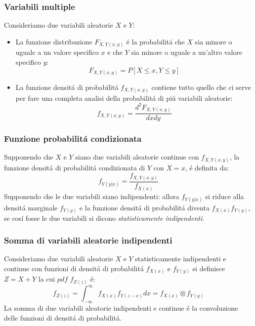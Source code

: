         \subsubsection{Variabili multiple}
            Consideriamo due variabili aleatorie $X$ e $Y$:
            \begin{itemize}
                \item {
                    La funzione distribuzione $F_{X,Y (x,y)}$ é la probabilitá che $X$ sia minore o uguale a un valore specifico $x$ e che $Y$
                    sia minore o uguale a un'altro valore specifico $y$:
                    \[
                        F_{X,Y (x,y)} = P[X\leq x,Y\leq y]    
                    \]
                }
                \item {
                    La funzione densitá di probabilitá $f_{X,Y (x,y)}$ contiene tutto quello che ci serve per fare una completa analisi della probabilitá
                    di piú variabili aleatorie:
                    \[
                        f_{X,Y (x,y)} = \frac{d^2 F_{X,Y (x,y)}}{dxdy}     
                    \]

                }
            \end{itemize}
        \subsubsection{Funzione probabilitá condizionata}
            Supponendo che $X$ e $Y$ siano due variabili aleatorie continue con $f_{X,Y (x,y)}$, la funzione densitá di probabilitá condizionata di $Y$ con $X=x$,
            é definita da:
            \[
                f_{Y (y|x)} = \frac{f_{X,Y (x,y)}}{f_{X(x)}}     
            \]
            Supponendo che le due variabili siano indipendenti: allora $f_{Y (y|x)}$ si riduce alla densitá marginale $f_{Y (y)}$ e la funzione densitá di
            probabilitá diventa $f_{X (x)}f_{Y (y)}$, se cosí fosse le due variabili si dicono \emph{statisticamente indipendenti}.
        \subsubsection{Somma di variabili aleatorie indipendenti}
            Consideriamo due variabili aleatorie $X$ e $Y$ statisticamente indipendenti e continue con funzioni di densitá di probabilitá $f_{X (x)}$ e $f_{Y (y)}$ si 
            definisce $Z = X+Y$ la cui $pdf$ $f_{Z (z)}$ é:
            \[
                f_{Z (z)} = \int_{-\infty}^{\infty}f_{X (x)}f_{Y (z-x)} dx =  f_{X (x)} \otimes f_{Y (y)}
            \]
            La somma di due variabili aleatorie indipendenti e continue é la convoluzione delle funzioni di densitá di probabilitá.
